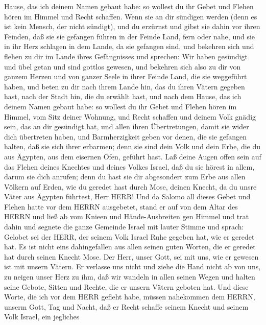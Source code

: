 Hause, das ich deinem Namen gebaut habe:  so wollest du ihr
Gebet und Flehen hören im Himmel und Recht schaffen.  Wenn
sie an dir sündigen werden (denn es ist kein Mensch, der nicht sündigt),
und du erzürnst und gibst sie dahin vor ihren Feinden, daß sie sie
gefangen führen in der Feinde Land, fern oder nahe,  und
sie in ihr Herz schlagen in dem Lande, da sie gefangen sind, und
bekehren sich und flehen zu dir im Lande ihres Gefängnisses und
sprechen: Wir haben gesündigt und übel getan und sind gottlos gewesen,
 und bekehren sich also zu dir von ganzem Herzen und von
ganzer Seele in ihrer Feinde Land, die sie weggeführt haben, und beten
zu dir nach ihrem Lande hin, das du ihren Vätern gegeben hast, nach der
Stadt hin, die du erwählt hast, und nach dem Hause, das ich deinem Namen
gebaut habe:  so wollest du ihr Gebet und Flehen hören im
Himmel, vom Sitz deiner Wohnung, und Recht schaffen  und
deinem Volk gnädig sein, das an dir gesündigt hat, und allen ihren
Übertretungen, damit sie wider dich übertreten haben, und Barmherzigkeit
geben vor denen, die sie gefangen halten, daß sie sich ihrer erbarmen;
 denn sie sind dein Volk und dein Erbe, die du aus Ägypten,
aus dem eisernen Ofen, geführt hast.  Laß deine Augen offen
sein auf das Flehen deines Knechtes und deines Volkes Israel, daß du sie
hörest in allem, darum sie dich anrufen;  denn du hast sie
dir abgesondert zum Erbe aus allen Völkern auf Erden, wie du geredet
hast durch Mose, deinen Knecht, da du unsre Väter aus Ägypten führtest,
Herr HERR!  Und da Salomo all dieses Gebet und Flehen hatte
vor dem HERRN ausgebetet, stand er auf von dem Altar des HERRN und ließ
ab vom Knieen und Hände-Ausbreiten gen Himmel  und trat
dahin und segnete die ganze Gemeinde Israel mit lauter Stimme und
sprach:  Gelobet sei der HERR, der seinem Volk Israel Ruhe
gegeben hat, wie er geredet hat. Es ist nicht eins dahingefallen aus
allen seinen guten Worten, die er geredet hat durch seinen Knecht Mose.
 Der Herr, unser Gott, sei mit uns, wie er gewesen ist mit
unsern Vätern. Er verlasse uns nicht und ziehe die Hand nicht ab von
uns,  zu neigen unser Herz zu ihm, daß wir wandeln in allen
seinen Wegen und halten seine Gebote, Sitten und Rechte, die er unsern
Vätern geboten hat.  Und diese Worte, die ich vor dem HERR
gefleht habe, müssen nahekommen dem HERRN, unserm Gott, Tag und Nacht,
daß er Recht schaffe seinem Knecht und seinem Volk Israel, ein jegliches
